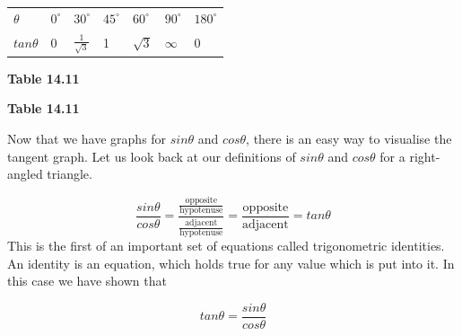 \begin{table}[H]
\begin{center}
\label{m39414*id89593}
\noindent
{}
\tablelasttail{}
\begin{xtabular}[t]{|l|l|l|l|l|l|l|}\hline
    $\theta $
    &
    ${0}^{\circ }$
    &
    ${30}^{\circ }$
    &
    ${45}^{\circ }$
    &
    ${60}^{\circ }$
    &
    ${90}^{\circ }$
    &
    ${180}^{\circ }$
\tabularnewline{}
    $tan\theta $
    &
0 &
    $\frac{1}{\sqrt{3}}$
    &
1 &
    $\sqrt{3}$
    &
    $\infty $
    &
0%
\tabularnewline{}
\end{xtabular}
\end{center}
\begin{center}{\small\bfseries Table 14.11}\end{center}
\begin{caption}{\small\bfseries Table 14.11}\end{caption}
\end{table}
\par
Now that we have graphs for $sin\theta $ and $cos\theta $, there is an easy way to visualise the tangent graph. Let us look back at our definitions of $sin\theta $ and $cos\theta $ for a right-angled triangle.\par 
\nopagebreak\noindent{}
\begin{equation*}
\frac{sin\theta }{cos\theta }=\frac{\frac{\mbox{opposite}}{\mbox{hypotenuse}}}{\frac{\mbox{adjacent}}{\mbox{hypotenuse}}}=\frac{\mbox{opposite}}{\mbox{adjacent}}=tan\theta 
\end{equation*}
This is the first of an important set of equations called trigonometric identities. An identity is an equation, which holds true for any value which is put into it. In this case we have shown that\par 
\nopagebreak\noindent{}
\begin{equation*}
tan\theta =\frac{sin\theta }{cos\theta }
\end{equation*}
